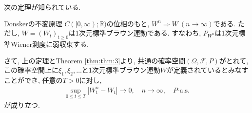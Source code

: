 次の定理が知られている.

\begin{theorem}{Donskerの不変原理}{}
    $C([0,\infty);\mathbb{R})$の位相のもと, $W^n\Rightarrow W~(n\to\infty)$である.
    ただし, $W=(W_t)_{t\geq 0}$は1次元標準ブラウン運動である.
    すなわち, $P_{W^n}$は1次元標準Wiener測度に弱収束する.
\end{theorem}

さて, 上の定理とTheorem \ref{thm:thm:3}より, 共通の確率空間$(\Omega,\mathcal{F},P)$がとれて, この確率空間上に$\xi_1,\xi_2,\dots$と1次元標準ブラウン運動$W$が定義されているとみなすことができ, 任意の$T>0$に対し,
\begin{align*}
    \sup_{0\leq t\leq T}|W^n_t-W_t|\to 0, \quad n\to\infty, \quad\text{$P$-a.s.}
\end{align*}
が成り立つ.


